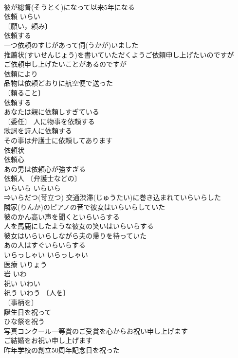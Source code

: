 \documentclass[8pt]{extreport}
\begin{document}
\begin{CJK}{UTF8}{min}
\\	彼が総督(そうとく)になって以来5年になる 
\\	依頼	いらい	
\\	〔願い，頼み〕
\\	依頼する 
\\	一つ依頼のすじがあって伺(うかが)いました 
\\	推薦状(すいせんじょう)を書いていただくようご依頼申し上げたいのですが 
\\	ご依頼申し上げたいことがあるのですが 
\\	依頼により 
\\	品物は依頼どおりに航空便で送った 
\\	〔頼ること〕
\\	依頼する 
\\	あなたは親に依頼しすぎている 
\\	〔委任〕 人に物事を依頼する 
\\	歌詞を詩人に依頼する 
\\	その事は弁護士に依頼してあります 
\\	依頼状 
\\	依頼心 
\\	あの男は依頼心が強すぎる 
\\	依頼人 〔弁護士などの〕
\\	いらいら	いらいら	
\\	⇒いらだつ(苛立つ) 交通渋滞(じゅうたい)に巻き込まれていらいらした 
\\	隣家(りんか)のピアノの音で彼女はいらいらしていた 
\\	彼のかん高い声を聞くといらいらする 
\\	人を馬鹿にしたような彼女の笑いはいらいらする 
\\	彼女はいらいらしながら夫の帰りを待っていた 
\\	あの人はすぐいらいらする 
\\	いらっしゃい	いらっしゃい	
\\	医療	いりょう	
\\	岩	いわ	
\\	祝い	いわい	
\\	祝う	いわう	〔人を〕
\\	〔事柄を〕
\\	誕生日を祝って 
\\	ひな祭を祝う 
\\	写真コンクール一等賞のご受賞を心からお祝い申し上げます 
\\	ご結婚をお祝い申し上げます 
\\	昨年学校の創立50周年記念日を祝った 

\end{CJK}
\end{document}
